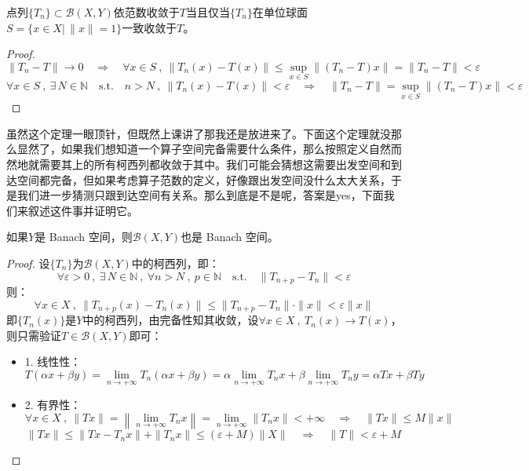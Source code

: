 \begin{theorem}
点列$\{T_n\} \subset \mathscr{B}(X,Y)$依范数收敛于$T$当且仅当$\{T_n\}$在单位球面$S=\{x \in X| \, \|x\|=1\}$一致收敛于$T$。
\end{theorem} 
\begin{proof}
\[\|T_n-T\| \to 0 \quad \Rightarrow \quad \forall x \in S \ , \ \|T_n(x)-T(x)\| \leq \mathop \text{sup}\limits_{x \in S}\|(T_n-T)x\|=\|T_n-T\|<\varepsilon\]
\[\forall x \in S \ , \ \exists \, N \in \mathbb{N} \quad \text{s.t.} \quad n>N \ , \ \|T_n(x)-T(x)\|<\varepsilon \quad \Rightarrow \quad \|T_n-T\|=\mathop \text{sup}\limits_{x \in S}\|(T_n-T)x\|<\varepsilon\]
\end{proof}

虽然这个定理一眼顶针，但既然上课讲了那我还是放进来了。下面这个定理就没那么显然了，如果我们想知道一个算子空间完备需要什么条件，那么按照定义自然而然地就需要其上的所有柯西列都收敛于其中。我们可能会猜想这需要出发空间和到达空间都完备，但如果考虑算子范数的定义，好像跟出发空间没什么太大关系，于是我们进一步猜测只跟到达空间有关系。那么到底是不是呢，答案是yes，下面我们来叙述这件事并证明它。
\begin{theorem}\label{theorem:wb}
如果$Y$是 Banach 空间，则$\mathscr{B}(X,Y)$也是 Banach 空间。
\end{theorem} 
\begin{proof}
设$\{T_n\}$为$\mathscr{B}(X,Y)$中的柯西列，即：
\[\forall \varepsilon>0 \ , \ \exists \, N \in \mathbb{N} \ , \ \forall n>N \ , \ p \in \mathbb{N} \quad \text{s.t.} \quad \|T_{n+p}-T_n\|<\varepsilon\]
则：
\[\forall x \in X \ , \ \|T_{n+p}(x)-T_n(x)\| \leq \|T_{n+p}-T_n\| \cdot \|x\|<\varepsilon\|x\|\]
即$\{T_n(x)\}$是$Y$中的柯西列，由完备性知其收敛，设$\forall x \in X \ , \ T_n(x) \to T(x)$，则只需验证$T \in \mathscr{B}(X,Y)$即可：
\begin{itemize}
\item 1. 线性性：
\[T(\alpha x+\beta y)=\lim_{n \to +\infty}T_n(\alpha x+\beta y)=\alpha\lim_{n \to +\infty}T_nx+\beta\lim_{n \to +\infty}T_ny=\alpha Tx+\beta Ty\]
\item 2. 有界性：
\[\forall x \in X \ , \ \|Tx\|=\left\|\lim_{n \to +\infty}T_nx\right\|=\lim_{n \to +\infty}\|T_nx\|<+\infty \quad \Rightarrow \quad \|Tx\| \leq M\|x\|\]
\[\|Tx\| \leq \|Tx-T_nx\|+\|T_nx\| \leq (\varepsilon+M)\|X\| \quad \Rightarrow \quad \|T\|<\varepsilon+M\]
\end{itemize}
\end{proof}

